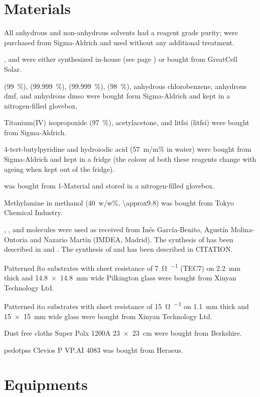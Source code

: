 \section{Materials}

	All anhydrous and non-anhydrous solvents had a reagent grade purity; were purchased from Sigma-Aldrich and used without any additional treatment.
	
	,  and  were either synthesized in-house (see page \pageref{methods-MAI}) or bought from GreatCell Solar.
	
	\PbItwo (99~\%), \PbBrtwo (99.999~\%), \CsI (99.999~\%), \PbCltwo (98~\%), anhydrous chlorobenzene, anhydrous \gls{dmf}, and anhydrous \gls{dmso} were bought form Sigma-Aldrich and kept in a nitrogen-filled glovebox.
	
	Titanium(IV) isopropoxide (97~\%), acetylacetone, and \glsdesc{litfsi} (\gls{litfsi}) were bought from Sigma-Aldrich.
	
	4-tert-butylpyridine and hydroiodic acid (57~m/m\% in water) were bought from Sigma-Aldrich and kept in a fridge (the colour of both these reagents change with ageing when kept out of the fridge).
	
	\Spiro was bought from 1-Material and stored in a nitrogen-filled glovebox.
	
	Methylamine in methanol (40~w/w\%, \SI{\approx9.8}{\Molar}) was bought from Tokyo Chemical Industry.
	
	, , and  molecules were used as received from Inés García-Benito, Agustín Molina-Ontoria and Nazario Martín (IMDEA, Madrid). The synthesis of  has been described in  and . The synthesis of  and  has been described in CITATION.
	
	Patterned \gls{fto} substrates with sheet resistance of \SI{7}{\ohm\per\sq} (TEC7) on \SI{2.2}{\mm} thick and \SI{14.8x14.8}{\mm} wide Pilkington glass were bought from Xinyan Technology Ltd.
	
	Patterned \gls{ito} substrates with sheet resistance of \SI{15}{\ohm\per\sq} on \SI{1.1}{\mm} thick and \SI{15x15}{\mm} wide glass were bought from Xinyan Technology Ltd.
	
	Dust free cloths Super Polx 1200A \SI{23x23}{\cm} were bought from Berkshire.
	
	\Gls{pedotpss} Clevios P VP.AI 4083 was bought from Heraeus.
\section{Equipments}
	
